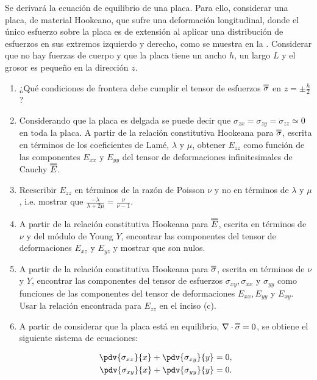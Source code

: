 \documentclass[../main.tex]{subfiles}
\begin{document}
\begin{problema}[4]
	Se derivará la ecuación de equilibrio de una placa. Para ello,
	considerar una placa, de material Hookeano, que sufre una deformación
	longitudinal, donde el único esfuerzo sobre la placa es de extensión
	al aplicar una distribución de esfuerzos en sus extremos izquierdo y derecho,
	como se muestra  en la . Considerar que no hay fuerzas de
	cuerpo y que la placa tiene un ancho \(h\), un largo \(L\) y el
	grosor es pequeño en la dirección \(z\).

	\begin{enumerate}
		\item ¿Qué condiciones de frontera debe cumplir el tensor de
		      esfuerzos \(\dbloverline{\sigma}\) en \(z = \pm \tfrac{h}{2}\)?
		\item Considerando que la placa es delgada se puede decir
		      que \(\sigma_{zx} = \sigma_{zy} = \sigma_{zz} \simeq 0\) en
		      toda la placa. A partir de la relación constitutiva Hookeana
		      para \(\dbloverline{\sigma}\), escrita en términos de los
		      coeficientes de Lamé, \(\lambda\) y \(\mu\), obtener \(E_{zz}\)
		      como función de las componentes \(E_{xx}\) y \( E_{yy}\) del
		      tensor de deformaciones infinitesimales de Cauchy \(\dbloverline{E}\).
		\item Reescribir \(E_{zz}\) en términos de la razón de Poisson \(\nu\) y
		      no en términos de \(\lambda\) y \(\mu\), i.e. mostrar que
		      \(\tfrac{-\lambda}{\lambda + 2\mu} = \tfrac{\nu}{\nu - 1}\).
		\item A partir de la relación constitutiva Hookeana para \(\dbloverline{E}\),
		      escrita en términos de \(\nu\) y del módulo de Young \(Y\), encontrar las
		      componentes del tensor de deformaciones \(E_{xz}\) y \(E_{yz}\) y
		      mostrar que son nulos.
		\item  A partir de la relación constitutiva Hookeana para \(\dbloverline{\sigma}\),
		      escrita en términos de \(\nu\) y \(Y\), encontrar las componentes del
		      tensor de esfuerzos \(\sigma_{xy}, \sigma_{xx}\) y \(\sigma_{yy}\) como
		      funciones de las componentes del tensor de deformaciones
		      \(E_{xx}, E_{yy}\) y \(E_{xy}\). Usar la relación encontrada para
		      \(E_{zz}\) en el inciso (c).
		\item A partir de considerar que la placa está en equilibrio,
		      \(\nabla \cdot{\dbloverline{\sigma}} = 0\), se obtiene el
		      siguiente sistema de ecuaciones:

		      \begin{align*}
			      \pdv{\sigma_{xx}}{x} + \pdv{\sigma_{xy}}{y} & = 0, \\
			      \pdv{\sigma_{xy}}{x} + \pdv{\sigma_{yy}}{y} & = 0.
		      \end{align*}


\end{enumerate}
\end{problema}
\end{document}
